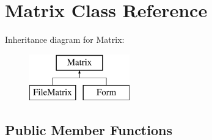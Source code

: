 \hypertarget{classMatrix}{
\section{Matrix Class Reference}
\label{classMatrix}
}
Inheritance diagram for Matrix:\begin{figure}[H]
\begin{center}
\leavevmode
\includegraphics[height=2.000000cm]{classMatrix}
\end{center}
\end{figure}
\subsection*{Public Member Functions}
